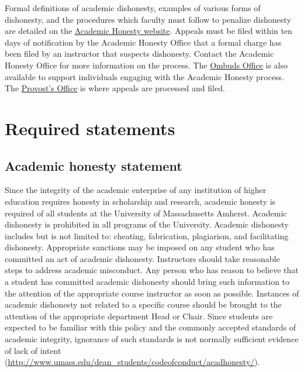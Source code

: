 \documentclass[11pt]{article}
\begin{document}
Formal definitions of academic dishonesty, examples of various forms of
dishonesty, and the procedures which faculty must follow to penalize dishonesty
are detailed on the \href{https://www.umass.edu/studentsuccess/academic-integrity}{Academic Honesty website}. Appeals must be filed within ten
days of notification by the Academic Honesty Office that a formal charge has
been filed by an instructor that suspects dishonesty. Contact the Academic
Honesty Office for more information on the process. The \href{https://www.umass.edu/ombuds/}{Ombuds Office} is also
available to support individuals engaging with the Academic Honesty process.
The \href{https://www.umass.edu/provost/}{Provost’s Office} is where appeals are processed and filed.

\section*{Required statements}
\label{sec:orga5a6c57}
\subsection*{Academic honesty statement}
\label{sec:org46986a4}
Since the integrity of the academic enterprise of any institution of higher
education requires honesty in scholarship and research, academic honesty is
required of all students at the University of Massachusetts Amherst. Academic
dishonesty is prohibited in all programs of the University. Academic dishonesty
includes but is not limited to: cheating, fabrication, plagiarism, and
facilitating dishonesty. Appropriate sanctions may be imposed on any student
who has committed an act of academic dishonesty. Instructors should take
reasonable steps to address academic misconduct. Any person who has reason to
believe that a student has committed academic dishonesty should bring such
information to the attention of the appropriate course instructor as soon as
possible. Instances of academic dishonesty not related to a specific course
should be brought to the attention of the appropriate department Head or Chair.
Since students are expected to be familiar with this policy and the commonly
accepted standards of academic integrity, ignorance of such standards is not
normally sufficient evidence of lack of intent
(\url{http://www.umass.edu/dean\_students/codeofconduct/acadhonesty/}).
\end{document}
